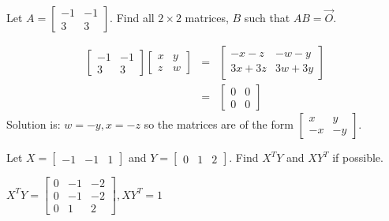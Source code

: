 \documentclass{ximera}
\begin{document}
\begin{problem}\label{prb:4.12} Let $A=\left[
\begin{array}{rr}
-1 & -1 \\
3 & 3
\end{array}
\right] $. Find all $2\times 2$ matrices, $B$
such that $AB=\vec{O}.$
\begin{hint}
\begin{eqnarray*}
\left[
\begin{array}{rr}
-1 & -1 \\
3 & 3
\end{array}
\right] \left[
\begin{array}{cc}
x & y \\
z & w
\end{array}
\right]  &=&\left[
\begin{array}{cc}
-x-z & -w-y \\
3x+3z & 3w+3y
\end{array}
\right]  \\
&=&\left[
\begin{array}{cc}
0 & 0 \\
0 & 0
\end{array}
\right]
\end{eqnarray*}
Solution is: $ w=-y,x=-z $ so the
matrices are of the form $\left[
\begin{array}{rr}
x & y \\
-x & -y
\end{array}
\right].$
\end{hint}
\end{problem}


\begin{problem}\label{prb:4.13} Let $X=\left[
\begin{array}{rrr}
-1 & -1 & 1
\end{array}
\right] $ and $Y=\left[
\begin{array}{rrr}
0 & 1 & 2
\end{array}
\right] .$ Find $X^{T}Y$ and $XY^{T}$ if
possible.
\begin{hint}
$X^{T}Y = \left[ \begin{array}{rrr}
0 & -1 & -2 \\
0 & -1 & -2 \\
0 & 1 & 2
\end{array}
\right] , XY^{T} = 1$
\end{hint}
\end{problem}
\end{document}

